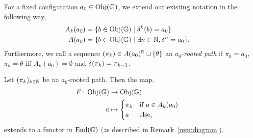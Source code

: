\documentclass[11pt,a4paper]{amsart}
\begin{document}
For a fixed configuration $a_0 \in \operatorname{Obj}(\mathbb{G})$, we extend our existing notation in the following way,
\begin{align*}
  A_k(a_0) &= \{b \in \operatorname{Obj}(\mathbb{G}) \mid \delta^k(b) = a_0\} \\ A(a_0) &= \{b \in \operatorname{Obj}(\mathbb{G}) \mid \exists n \in \mathbb{N}, \delta^n = a_0\}.
\end{align*}
Furthermore, we call a sequence $(\pi_k) \in A(a_0)^{\mathbb{N}} \sqcup \{\theta\} $ an \emph{$a_0$-rooted path} if $\pi_0 = a_0$, $\pi_k = \theta$ iff $A_k(a_0)=\emptyset$ and $\delta(\pi_k) = \pi_{k-1}$.
\begin{PROP}
  \label{prop:extend-functor}
  Let $(\pi_k)_{k \in \mathbb{N}}$ be an $a_0$-rooted path. Then the map,
  \begin{align*}
    F \colon \operatorname{Obj}(\mathbb{G}) &\to \operatorname{Obj}(\mathbb{G})\\
    a &\mapsto 
        \begin{cases}
          \pi_k &\text{if $a \in A_k(a_0)$}\\
          a &\text{else,}
        \end{cases}
  \end{align*}
  extends to a functor in $\operatorname{End}(\mathbb{G})$ (as described in Remark~\ref{rem:diagram}).

  \proof {} 
\end{PROP}
\end{document}
